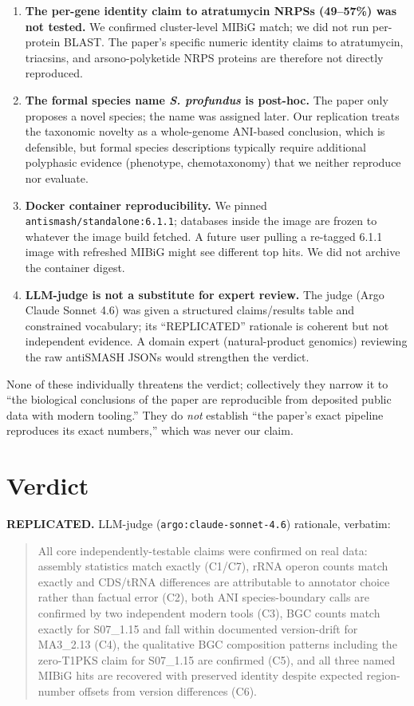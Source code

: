 \documentclass[11pt,letterpaper]{article}
\begin{document}
\begin{enumerate}[leftmargin=1.5em]
\item \textbf{The per-gene identity claim to atratumycin NRPSs (49--57\%) was not tested.} We confirmed cluster-level MIBiG match; we did not run per-protein BLAST. The paper's specific numeric identity claims to atratumycin, triacsins, and arsono-polyketide NRPS proteins are therefore not directly reproduced.

\item \textbf{The formal species name \textit{S. profundus} is post-hoc.} The paper only proposes a novel species; the name was assigned later. Our replication treats the taxonomic novelty as a whole-genome ANI-based conclusion, which is defensible, but formal species descriptions typically require additional polyphasic evidence (phenotype, chemotaxonomy) that we neither reproduce nor evaluate.

\item \textbf{Docker container reproducibility.} We pinned \texttt{antismash/standalone:6.1.1}; databases inside the image are frozen to whatever the image build fetched. A future user pulling a re-tagged 6.1.1 image with refreshed MIBiG might see different top hits. We did not archive the container digest.

\item \textbf{LLM-judge is not a substitute for expert review.} The judge (Argo Claude Sonnet 4.6) was given a structured claims/results table and constrained vocabulary; its ``REPLICATED'' rationale is coherent but not independent evidence. A domain expert (natural-product genomics) reviewing the raw antiSMASH JSONs would strengthen the verdict.
\end{enumerate}

None of these individually threatens the verdict; collectively they narrow it to ``the biological conclusions of the paper are reproducible from deposited public data with modern tooling.'' They do \textit{not} establish ``the paper's exact pipeline reproduces its exact numbers,'' which was never our claim.

\section{Verdict}
\textbf{REPLICATED.} LLM-judge (\texttt{argo:claude-sonnet-4.6}) rationale, verbatim:

\begin{quote}
All core independently-testable claims were confirmed on real data: assembly statistics match exactly (C1/C7), rRNA operon counts match exactly and CDS/tRNA differences are attributable to annotator choice rather than factual error (C2), both ANI species-boundary calls are confirmed by two independent modern tools (C3), BGC counts match exactly for S07\_1.15 and fall within documented version-drift for MA3\_2.13 (C4), the qualitative BGC composition patterns including the zero-T1PKS claim for S07\_1.15 are confirmed (C5), and all three named MIBiG hits are recovered with preserved identity despite expected region-number offsets from version differences (C6).
\end{quote}
\end{document}
